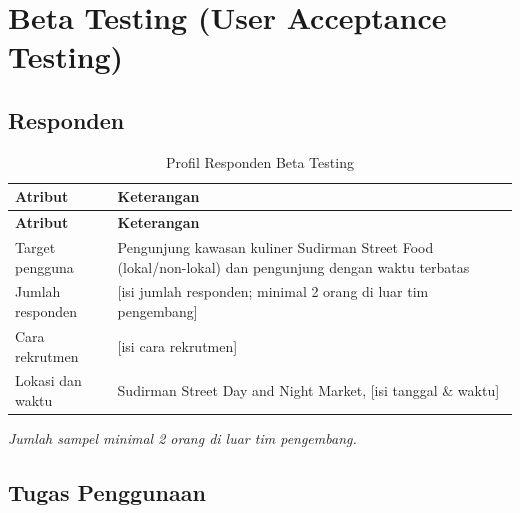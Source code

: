 \chapter{Beta Testing (User Acceptance Testing)}
\label{bab:beta-testing}

\section{Responden}

\begin{longtable}{|L{0.30}|L{0.70}|}
\caption{Profil Responden Beta Testing}\\
\hline
{}\textbf{Atribut} & \textbf{Keterangan} \\ \hline
\endfirsthead
\hline
{}\textbf{Atribut} & \textbf{Keterangan} \\ \hline
\endhead
Target pengguna & Pengunjung kawasan kuliner Sudirman Street Food (lokal/non-lokal) dan pengunjung dengan waktu terbatas \\ \hline
Jumlah responden & [isi jumlah responden; minimal 2 orang di luar tim pengembang] \\ \hline
Cara rekrutmen & [isi cara rekrutmen] \\ \hline
Lokasi dan waktu & Sudirman Street Day and Night Market, [isi tanggal \& waktu] \\ \hline
\end{longtable}

\textit{Jumlah sampel minimal 2 orang di luar tim pengembang.}

\section{Tugas Penggunaan}


